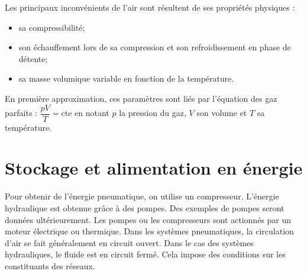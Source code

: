 \documentclass[10pt]{article}
\begin{document}
\begin{rem}
Les principaux inconvénients de l'air sont résultent de ses propriétés physiques : 
\begin{itemize}
\item sa compressibilité;
\item son échauffement lors de sa compression et son refroidissement en phase de détente;
\item sa masse volumique variable en fonction de la température.
\end{itemize}
En première approximation, ces paramètres sont liés par l'équation des gaz parfaits : $\dfrac{pV}{T} = \text{cte}$ en notant $p$ la pression du gaz, $V$ son volume et $T$ sa température. 

\end{rem}





\section{Stockage et alimentation en énergie}

Pour obtenir de l'énergie pneumatique, on utilise un compresseur. L'énergie hydraulique est obtenue grâce à des pompes. Des exemples de pompes seront données ultérieurement. Les pompes ou les compresseurs sont actionnés par un moteur électrique ou thermique. Dans les systèmes pneumatiques, la circulation d'air se fait généralement en circuit ouvert. Dans le cas des systèmes hydrauliques, le fluide est en circuit fermé. Cela impose des conditions sur les constituants des réseaux. 
\end{document}
